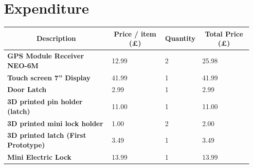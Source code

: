 \documentclass[11pt,landscape]{article}
\begin{document}
\section{Expenditure}
\begin{table}[H]
    \begin{center}
        
    \begin{tabular}{|l|l|l|l|}
        \hline
    \multicolumn{1}{c}{\textbf{Description}}                                          & \multicolumn{1}{c}{\textbf{Price / item (£)}} & \multicolumn{1}{c}{\textbf{Quantity}} & \multicolumn{1}{c}{\textbf{Total Price (£)}}          \\ \hline
    \textbf{GPS Module Receiver  NEO-6M}                                                       & 12.99                                         & 2                                     & 25.98                                                 \\ \hline
    \textbf{Touch screen 7'' Display}                                                          & 41.99                                         & 1                                     & 41.99                                                 \\ \hline
    \textbf{Door Latch}                                                                        & 2.99                                          & 1                                     & 2.99                                                  \\ \hline
    \textbf{3D printed pin holder (latch)}                                                     & 11.00                                         & 1                                     & 11.00                                                 \\ \hline
    \textbf{3D printed mini lock holder}                                                       & 1.00                                          & 2                                     & 2.00                                                  \\ \hline
    \textbf{3D printed latch (First Prototype)}                                                & 3.49                                          & 1                                     & 3.49                                                  \\ \hline
    \textbf{Mini Electric Lock}                                                                & 13.99                                         & 1                                     & 13.99                                                 \\ \hline

\end{tabular}
\end{center}
\end{table}
\end{document}
